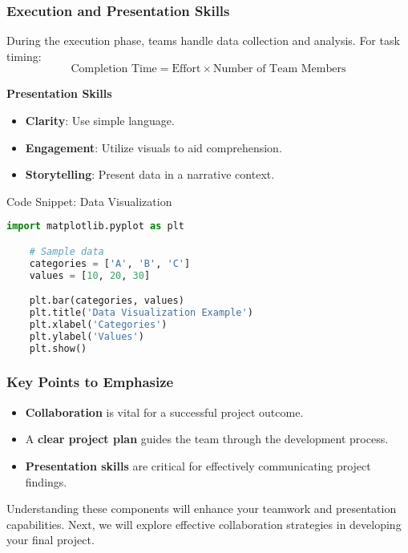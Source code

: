 \documentclass[aspectratio=169]{beamer}
\begin{document}
\begin{frame}[fragile]
    \frametitle{Execution and Presentation Skills}
    During the execution phase, teams handle data collection and analysis. For task timing:
    \begin{equation}
        \text{Completion Time} = \text{Effort} \times \text{Number of Team Members}
    \end{equation}
    
    \textbf{Presentation Skills}
    \begin{itemize}
        \item \textbf{Clarity}: Use simple language.
        \item \textbf{Engagement}: Utilize visuals to aid comprehension.
        \item \textbf{Storytelling}: Present data in a narrative context.
    \end{itemize}

    \begin{block}{Code Snippet: Data Visualization}
    \begin{lstlisting}[language=Python]
    import matplotlib.pyplot as plt

    # Sample data
    categories = ['A', 'B', 'C']
    values = [10, 20, 30]

    plt.bar(categories, values)
    plt.title('Data Visualization Example')
    plt.xlabel('Categories')
    plt.ylabel('Values')
    plt.show()
    \end{lstlisting}
    \end{block}
\end{frame}

\begin{frame}[fragile]
    \frametitle{Key Points to Emphasize}
    \begin{itemize}
        \item \textbf{Collaboration} is vital for a successful project outcome.
        \item A \textbf{clear project plan} guides the team through the development process.
        \item \textbf{Presentation skills} are critical for effectively communicating project findings.
    \end{itemize}

    Understanding these components will enhance your teamwork and presentation capabilities. Next, we will explore effective collaboration strategies in developing your final project.
\end{frame}
\end{document}
